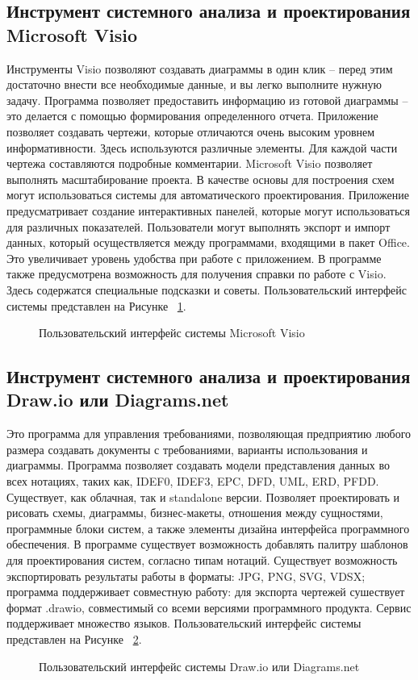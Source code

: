 \subsection{Инструмент системного анализа и проектирования Microsoft Visio}\label{sec:ch1/sec6/sub5}
Инструменты Visio позволяют создавать диаграммы в один клик – перед этим достаточно внести все необходимые данные, и вы легко выполните нужную задачу. Программа позволяет предоставить информацию из готовой диаграммы – это делается с помощью формирования определенного отчета.
Приложение позволяет создавать чертежи, которые отличаются очень высоким уровнем информативности. Здесь используются различные элементы. Для каждой части чертежа составляются подробные комментарии.
Microsoft Visio позволяет выполнять масштабирование проекта. В качестве основы для построения схем могут использоваться системы для автоматического проектирования. Приложение предусматривает создание интерактивных панелей, которые могут использоваться для различных показателей.
Пользователи могут выполнять экспорт и импорт данных, который осуществляется между программами, входящими в пакет Office. Это увеличивает уровень удобства при работе с приложением. В программе также предусмотрена возможность для получения справки по работе с Visio. Здесь содержатся специальные подсказки и советы.
Пользовательский интерфейс системы представлен на Рисунке ~\cref{fig:Visio}.
\begin{figure}[ht1]
    \caption{Пользовательский интерфейс системы Microsoft Visio}\label{fig:Visio}
\end{figure}
\subsection{Инструмент системного анализа и проектирования Draw.io или Diagrams.net}\label{sec:ch1/sec6/sub6}
Это программа для управления требованиями, позволяющая предприятию любого размера создавать документы с требованиями, варианты использования и диаграммы. Программа позволяет создавать модели представления данных во всех нотациях, таких как, IDEF0, IDEF3, EPC, DFD, UML, ERD, PFDD. Существует, как облачная, так и standalone версии. Позволяет проектировать и рисовать схемы, диаграммы, бизнес-макеты, отношения между сущностями, программные блоки систем, а также элементы дизайна интерфейса программного обеспечения. В программе существует возможность добавлять палитру шаблонов для проектирования систем, согласно типам нотаций. Существует возможность экспортировать результаты работы в форматы: JPG, PNG, SVG, VDSX; программа поддерживает совместную работу: для экспорта чертежей сушествует формат .drawio, совместимый со всеми версиями программного продукта. Сервис поддерживает множество языков.
Пользовательский интерфейс системы представлен на Рисунке ~\cref{fig:Draw.io}.
\begin{figure}[ht1]
    \caption{Пользовательский интерфейс системы Draw.io или Diagrams.net}\label{fig:Draw.io}
\end{figure}

